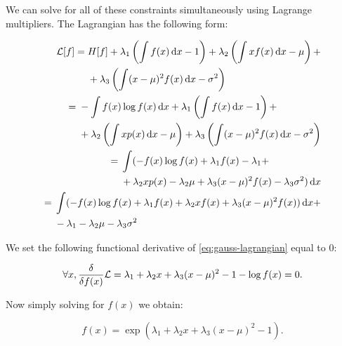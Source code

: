 We can solve for all of these constraints simultaneously using Lagrange
multipliers. The Lagrangian has the following form:

\begin{align}
  \begin{split}
    \gL[f] ={}& H[f] + \lambda_1 \left( \int f(x) \dx - 1 \right) + \lambda_2 \left( \int x f(x) \dx - \mu \right) + \\
              &+ \lambda_3 \left( \int (x - \mu)^2 f(x) \dx - \sigma^2 \right)
  \end{split} \\
  \begin{split}
    ={}& -\int f(x) \log f(x) \dx  + \lambda_1 \left( \int f(x) \dx - 1 \right) + \\
       &+ \lambda_2 \left( \int x p(x) \dx - \mu \right) + \lambda_3 \left( \int (x - \mu)^2  f(x) \dx - \sigma^2 \right)
  \end{split} \\
  \begin{split}
    ={}& \int ( - f(x) \log f(x) + \lambda_1 f(x) - \lambda_1 + \\
       &+ \lambda_2 x p(x) - \lambda_2 \mu + \lambda_3 (x - \mu)^2  f(x) - \lambda_3 \sigma^2 ) \dx \\
  \end{split} \\
  \begin{split}
    ={}& \int ( - f(x)\log f(x) + \lambda_1 f(x) + \lambda_2 x f(x) + \lambda_3 (x - \mu)^2  f(x) ) \dx + \\
       &- \lambda_1 - \lambda_2 \mu - \lambda_3 \sigma^2 \label{eq:gauss-lagrangian}
  \end{split}
\end{align}

 We set the following functional derivative of
\eqref{eq:gauss-lagrangian} equal to $0$:

\begin{equation}
  \forall x, \frac{\delta}{\delta f(x)} {\mathcal{L}} = \lambda_1 + \lambda_2 x + \lambda_3 (x - \mu)^2 - 1 - \log f(x) = 0.
\end{equation}

Now simply solving for $f(x)$ we obtain:

\begin{equation}
  f(x) = \exp \left( \lambda_1 + \lambda_2 x + \lambda_3 (x - \mu)^2 - 1 \right).
\end{equation}

